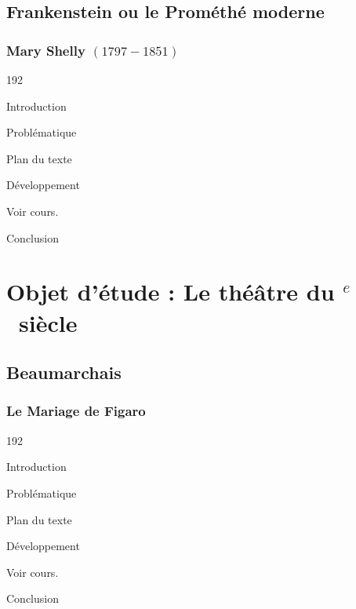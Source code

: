 \documentclass[12pt,a4paper]{article}
\begin{document}
\subsection{Frankenstein ou le Prom\'eth\'e moderne}
				\subsubsection{Mary Shelly $(1797 - 1851) $}
\begin{dingautolist}{192}

\item Introduction \par
\item Probl\'ematique \par
\item Plan du texte \par
\item D\'eveloppement \par
        Voir cours.

\item Conclusion \par

\end{dingautolist}

 \newpage

		\section[La com\'edie du valet]{Objet d'\'etude : Le th\'e\^atre du \textsc{}$^{e}$~siècle}
			\subsection{Beaumarchais}
				\subsubsection{Le Mariage de Figaro}
\begin{dingautolist}{192}

\item Introduction \par
\item Probl\'ematique \par
\item Plan du texte \par
\item D\'eveloppement \par
        Voir cours.

\item Conclusion \par

\end{dingautolist}		
 \newpage
\end{document}
